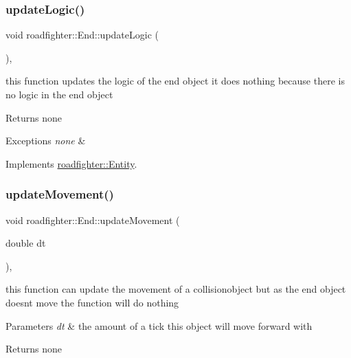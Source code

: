 \subsubsection{\texorpdfstring{update\+Logic()}{updateLogic()}}
{\footnotesize\ttfamily void roadfighter\+::\+End\+::update\+Logic (\begin{DoxyParamCaption}{ }\end{DoxyParamCaption})\hspace{0.3cm}{\ttfamily [override]}, {\ttfamily [virtual]}}

this function updates the logic of the end object it does nothing because there is no logic in the end object \begin{DoxyReturn}{Returns}
none 
\end{DoxyReturn}

\begin{DoxyExceptions}{Exceptions}
{\em none} & \\
\hline
\end{DoxyExceptions}


Implements \hyperlink{classroadfighter_1_1Entity_a54c00f1af306290bae3e4b84e196566b}{roadfighter\+::\+Entity}.

\mbox{\label{classroadfighter_1_1End_a6ea4afe8b07f96801fb2a67b82d6b71c}} 
\subsubsection{\texorpdfstring{update\+Movement()}{updateMovement()}}
{\footnotesize\ttfamily void roadfighter\+::\+End\+::update\+Movement (\begin{DoxyParamCaption}\item[{double}]{dt }\end{DoxyParamCaption})\hspace{0.3cm}{\ttfamily [override]}, {\ttfamily [virtual]}}

this function can update the movement of a collisionobject but as the end object doesnt move the function will do nothing 
\begin{DoxyParams}{Parameters}
{\em dt} & the amount of a tick this object will move forward with \\
\hline
\end{DoxyParams}
\begin{DoxyReturn}{Returns}
none 
\end{DoxyReturn}

